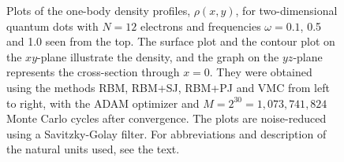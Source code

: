\begin{landscape}
\begin{figure} [H]
		\caption{Plots of the one-body density profiles, $\rho(x,y)$, for two-dimensional quantum dots with $N=12$ electrons and frequencies $\omega=0.1$, 0.5 and 1.0 seen from the top. The surface plot and the contour plot on the $xy$-plane illustrate the density, and the graph on the $yz$-plane represents the cross-section through $x=0$. They were obtained using the methods RBM, RBM+SJ, RBM+PJ and VMC from left to right, with the ADAM optimizer and $M=2^{30}=1,073,741,824$ Monte Carlo cycles after convergence. The plots are noise-reduced using a Savitzky-Golay filter. For abbreviations and description of the natural units used, see the text.}%
		\label{fig:OB2_interaction_12P}
	\end{figure}
	\begin{figure} [H]%
		\centering
		\captionsetup[subfigure]{labelformat=empty}
		\captionsetup{width=0.9\hsize}
		\hspace{0.1cm}
		\hspace{-0.0cm}
		\hspace{-0.0cm}
		\hspace{-0.0cm}

\end{figure}
\end{landscape}
